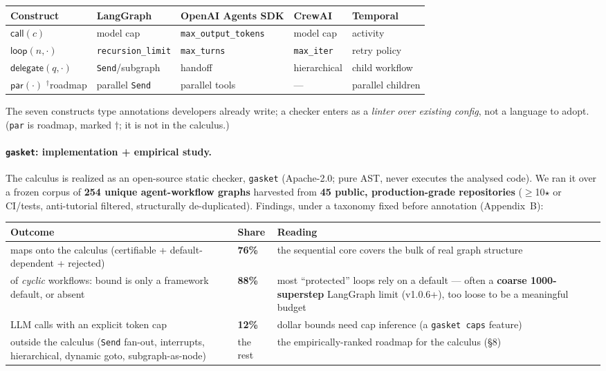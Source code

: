 \documentclass[11pt]{article}
\theoremstyle{plain}
\newcommand{\kw}[1]{\mathsf{#1}}                      %
\begin{document}
\begin{center}\small
\begin{tabular}{@{}lllll@{}}
\toprule
Construct & LangGraph & OpenAI Agents SDK & CrewAI & Temporal \\
\midrule
$\kw{call}(c)$ & model cap & \texttt{max\_output\_tokens} & model cap & activity \\
$\kw{loop}(n, \cdot)$ & \texttt{recursion\_limit} & \texttt{max\_turns} & \texttt{max\_iter} & retry policy \\
$\kw{delegate}(q, \cdot)$ & \texttt{Send}/subgraph & handoff & hierarchical & child workflow \\
$\kw{par}(\cdot)$ $^{\dagger}$roadmap & parallel \texttt{Send} & parallel tools & --- & parallel children \\
\bottomrule
\end{tabular}
\end{center}

The seven constructs type annotations developers already write; a checker enters as a \emph{linter
over existing config}, not a language to adopt. (\texttt{par} is roadmap, marked $\dagger$; it is
not in the calculus.)

\paragraph{\texttt{gasket}: implementation + empirical study.}
The calculus is realized as an open-source static checker, \texttt{gasket} (Apache-2.0; pure AST,
never executes the analysed code). We ran it over a frozen corpus of \textbf{254 unique
agent-workflow graphs} harvested from \textbf{45 public, production-grade repositories} ($\ge$10$\star$
or CI/tests, anti-tutorial filtered, structurally de-duplicated). Findings, under a taxonomy fixed
before annotation (Appendix~B):

\begin{center}\footnotesize
\begin{tabular}{@{}R{6.4cm}R{1.4cm}R{6.1cm}@{}}
\toprule
Outcome & Share & Reading \\
\midrule
maps onto the calculus (certifiable + default-dependent + rejected) & \textbf{76\%} &
  the sequential core covers the bulk of real graph structure \\
of \emph{cyclic} workflows: bound is only a framework default, or absent & \textbf{88\%} &
  most ``protected'' loops rely on a default --- often a \textbf{coarse 1000-superstep} LangGraph
  limit (v1.0.6+), too loose to be a meaningful budget \\
LLM calls with an explicit token cap & \textbf{12\%} &
  dollar bounds need cap inference (a \texttt{gasket caps} feature) \\
outside the calculus (\texttt{Send} fan-out, interrupts, hierarchical, dynamic goto,
  subgraph-as-node) & the rest & the empirically-ranked roadmap for the calculus (\S8) \\
\bottomrule
\end{tabular}
\end{center}
\end{document}
